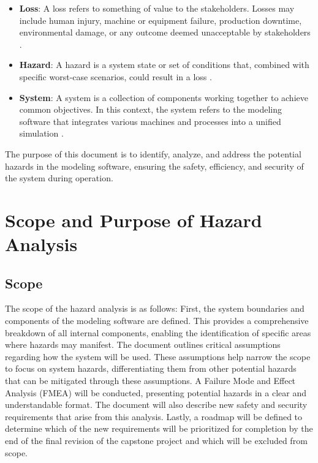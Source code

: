\documentclass{article}
\begin{document}
\begin{itemize}
    \item \textbf{Loss}: A loss refers to something of value to the stakeholders. Losses may include human injury, machine or equipment failure, production downtime, environmental damage, or any outcome deemed unacceptable by stakeholders \cite{Leveson2018}.
    \item \textbf{Hazard}: A hazard is a system state or set of conditions that, combined with specific worst-case scenarios, could result in a loss \cite{Leveson2018}.
    \item \textbf{System}: A system is a collection of components working together to achieve common objectives. In this context, the system refers to the modeling software that integrates various machines and processes into a unified simulation \cite{Leveson2018}.
\end{itemize}

The purpose of this document is to identify, analyze, and address the potential hazards in the modeling software, ensuring the safety, efficiency, and security of the system during operation.

\section{Scope and Purpose of Hazard Analysis}

\subsection{Scope} The scope of the hazard analysis is as follows: First, the system boundaries and components of the modeling software are defined. This provides a comprehensive breakdown of all internal components, enabling the identification of specific areas where hazards may manifest. The document outlines critical assumptions regarding how the system will be used. These assumptions help narrow the scope to focus on system hazards, differentiating them from other potential hazards that can be mitigated through these assumptions. A Failure Mode and Effect Analysis (FMEA) will be conducted, presenting potential hazards in a clear and understandable format. The document will also describe new safety and security requirements that arise from this analysis. Lastly, a roadmap will be defined to determine which of the new requirements will be prioritized for completion by the end of the final revision of the capstone project and which will be excluded from scope.
\end{document}
